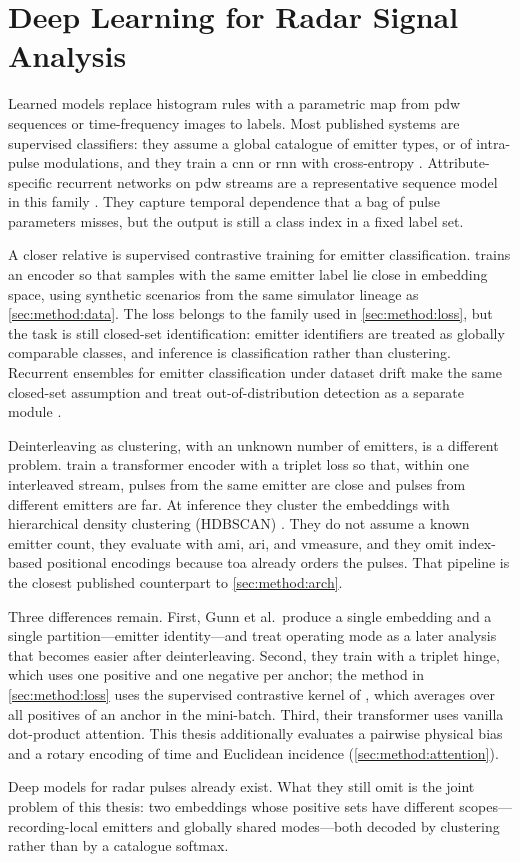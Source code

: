 \section{Deep Learning for Radar Signal Analysis}\label{sec:related:dl_radar}

Learned models replace histogram rules with a parametric map from \gls{pdw} sequences or time-frequency images to labels.
Most published systems are supervised classifiers: they assume a global catalogue of emitter types, or of intra-pulse modulations, and they train a \gls{cnn} or \gls{rnn} with cross-entropy \parencite{qu2026radardeinterleavingreview}.
Attribute-specific recurrent networks on \gls{pdw} streams are a representative sequence model in this family \parencite{notaro2019emitter}.
They capture temporal dependence that a bag of pulse parameters misses, but the output is still a class index in a fixed label set.

A closer relative is supervised contrastive training for emitter classification.
\textcite{jonsson2023supcon} trains an encoder so that samples with the same emitter label lie close in embedding space, using synthetic scenarios from the same simulator lineage as \cref{sec:method:data}.
The loss belongs to the family used in \cref{sec:method:loss}, but the task is still closed-set identification: emitter identifiers are treated as globally comparable classes, and inference is classification rather than clustering.
Recurrent ensembles for emitter classification under dataset drift make the same closed-set assumption and treat out-of-distribution detection as a separate module \parencite{coleman2023rwrdrift}.

Deinterleaving as clustering, with an unknown number of emitters, is a different problem.
\textcite{gunn2025deinterleaving} train a transformer encoder with a triplet loss so that, within one interleaved stream, pulses from the same emitter are close and pulses from different emitters are far.
At inference they cluster the embeddings with hierarchical density clustering (HDBSCAN) \parencite{campello2015hierarchical,mcinnes2017hdbscan}.
They do not assume a known emitter count, they evaluate with \gls{ami}, \gls{ari}, and \gls{vmeasure}, and they omit index-based positional encodings because \gls{toa} already orders the pulses.
That pipeline is the closest published counterpart to \cref{sec:method:arch}.

Three differences remain.
First, Gunn et al.\ produce a single embedding and a single partition---emitter identity---and treat operating mode as a later analysis that becomes easier after deinterleaving.
Second, they train with a triplet hinge, which uses one positive and one negative per anchor; the method in \cref{sec:method:loss} uses the supervised contrastive kernel of \textcite{khosla2020supcon}, which averages over all positives of an anchor in the mini-batch.
Third, their transformer uses vanilla dot-product attention.
This thesis additionally evaluates a pairwise physical bias and a rotary encoding of time and Euclidean incidence (\cref{sec:method:attention}).

Deep models for radar pulses already exist.
What they still omit is the joint problem of this thesis: two embeddings whose positive sets have different scopes---recording-local emitters and globally shared modes---both decoded by clustering rather than by a catalogue softmax.
